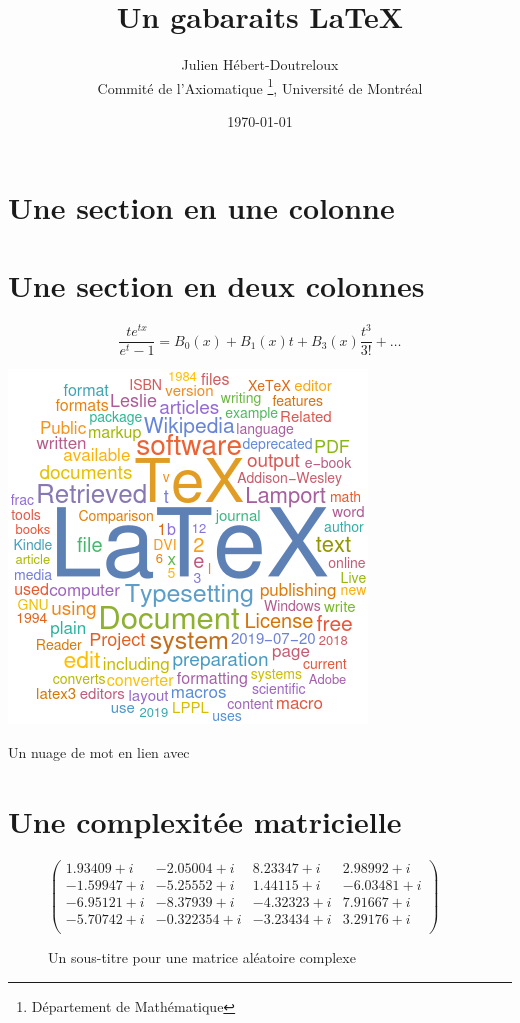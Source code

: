 \documentclass[french, babel]{article}
\title{Un gabaraits \LaTeX}
\author{Julien H\'ebert-Doutreloux\\%
	Commité de l'Axiomatique%
	\thanks{D\'epartement de Math\'ematique}, Université de Montréal}
\date{\today}
\begin{document}
	\maketitle
	\tableofcontents
	\vspace{1cm}
\section[Ce qui apparait dans la table des mati\`ere]{Une section en une colonne}
	\lipsum[3-5]
\section[D\'ebut d'article]{Une section en deux colonnes}
	\begin{multicols*}{2}
		\lipsum[5-6]
			\[\frac{te^{tx}}{e^t-1}=B_0(x)+B_1(x)t+B_3(x)\frac{t^3}{3!}+\dots\]
		\lipsum[7-8]
		\begin{center}
			\includegraphics[width=.3\textwidth]{WordCloudLaTeX}
			\caption{Un nuage de mot en lien avec \LaTeXe}
		\end{center}
	\lipsum[8-14]
	\end{multicols*}
\section[Suite avec des tableaux]{Une complexit\'ee matricielle}
	\lipsum[14-15]
	\begin{figure}[ht]
	\centering
	$
	\left(
	\begin{array}{cccc}
		1.93409 + i & -2.05004+ i &
		8.23347 + i & 2.98992 + i \\
		-1.59947+ i & -5.25552+ i &
		1.44115 + i & -6.03481+ i \\
		-6.95121+ i & -8.37939+ i &
		-4.32323+ i & 7.91667 + i \\
		-5.70742+ i & -0.322354+i &
		-3.23434+ i & 3.29176 + i \\
	\end{array}
	\right)
	$
	\caption{Un sous-titre pour une matrice aléatoire complexe}
	\end{figure}
\end{document}
